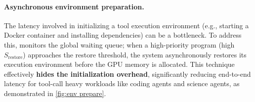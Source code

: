 \paragraph{Asynchronous environment preparation.} The latency involved in initializing a tool execution environment
 (e.g., starting a Docker container and installing dependencies) can be a bottleneck. To address this, \ouralg monitors the global waiting queue; when a high-priority program (high $S_\text{restore}$) approaches the restore threshold, the system asynchronously restores its execution environment before the GPU memory is allocated. This technique effectively \textbf{hides the initialization overhead}, significantly reducing end-to-end latency for tool-call heavy workloads like coding agents and science agents, as demonstrated in \autoref{fig:env prepare}.